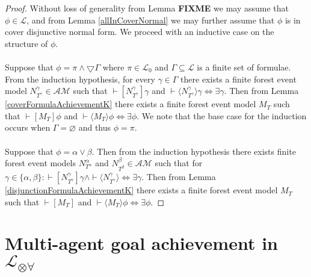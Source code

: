 \documentclass[12pt, a4paper, titlepage]{scrartcl}
\numberwithin{equation}{section}
\newcommand{\cover}{\bigtriangledown}
\newcommand{\sqex}[1]{[{#1}]}
\newcommand{\anex}[1]{\langle {#1} \rangle}
\newcommand{\lang}{\mathcal{L}}
\newcommand{\langArbAct}{\lang_{\otimes\forall}}
\newcommand{\langProp}{\lang_0}
\newcommand{\eventClass}{\mathcal{AM}}
\newcommand{\FIXME}{{\bf FIXME}}
\begin{document}
\begin{proof}
Without loss of generality from Lemma {\FIXME} we may assume that $\phi \in \lang$, and from Lemma
\ref{allInCoverNormal} we may further assume that $\phi$ is in cover disjunctive normal form.
We proceed with an inductive case on the structure of $\phi$.\\
\\
Suppose that $\phi = \pi \land \cover \Gamma$ where $\pi \in \langProp$ and $\Gamma \subseteq \lang$
is a finite set of formulae.
From the induction hypothesis, for every $\gamma \in \Gamma$ there exists a finite forest event
model $N^\gamma_{T^\gamma} \in \eventClass$ such that $\vdash \sqex{N^\gamma_{T^\gamma}} \gamma$ and
$\vdash \anex{N^\gamma_{T^\gamma}} \gamma \iff \exists \gamma$.
Then from Lemma \ref{coverFormulaAchievementK} there exists a finite forest event model $M_T$ such
that $\vdash \sqex{M_T} \phi$ and $\vdash \anex{M_T} \phi \iff \exists \phi$.
We note that the base case for the induction occurs when $\Gamma = \varnothing$ and thus $\phi =
\pi$.\\
\\
Suppose that $\phi = \alpha \lor \beta$.
Then from the induction hypothesis there exists finite forest event models $N^\alpha_{T^\alpha}$ and
$N^\beta_{T^\beta} \in \eventClass$ such that for $\gamma \in \{\alpha, \beta\}:
\vdash \sqex{N^\gamma_{T^\gamma}} \gamma \land \vdash \anex{N^\gamma_{T^\gamma}} \iff \exists
\gamma$.
Then from Lemma \ref{disjunctionFormulaAchievementK} there exists a finite forest event model $M_T$ such
that $\vdash \sqex{M_T}$ and $\vdash \anex{M_T} \phi \iff \exists \phi$.
\end{proof}

\section{Multi-agent goal achievement in $\langArbAct$}
\end{document}
